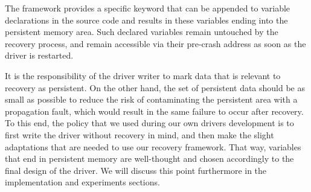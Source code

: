 \documentclass{report}
\begin{document}
The framework provides a specific keyword that can be appended to variable declarations in the source code and results in these variables ending into the persistent memory area. Such declared variables remain untouched by the recovery process, and remain accessible via their pre-crash address as soon as the driver is restarted.

It is the responsibility of the driver writer to mark data that is relevant to recovery as persistent. On the other hand, the set of persistent data should be as small as possible to reduce the risk of contaminating the persistent area with a propagation fault, which would result in the same failure to occur after recovery. To this end, the policy that we used during our own drivers development is to first write the driver without recovery in mind, and then make the slight adaptations that are needed to use our recovery framework. That way, variables that end in persistent memory are well-thought and chosen accordingly to the final design of the driver. We will discuss this point furthermore in the implementation and experiments sections.



\end{document}
